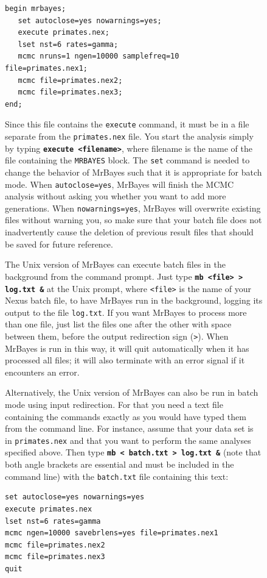 \documentclass[12pt]{book}
\newcommand{\ttt}[1]{\texttt{#1}}
\newcommand{\tb}[1]{\ttt{\textbf{#1}}}
\begin{document}
\begin{figure}[h]
\begin{singlespacing}
\footnotesize
\begin{verbatim}
begin mrbayes;
   set autoclose=yes nowarnings=yes;
   execute primates.nex;
   lset nst=6 rates=gamma;
   mcmc nruns=1 ngen=10000 samplefreq=10 file=primates.nex1;
   mcmc file=primates.nex2;
   mcmc file=primates.nex3;
end;
\end{verbatim}
\normalsize
\end{singlespacing}

Since this file contains the \ttt{execute} command, it must be in a file separate from the
\ttt{primates.nex} file. You start the analysis simply by typing \tb{execute <filename>}, where
filename is the name of the file containing the \ttt{MRBAYES} block. The \ttt{set} command is
needed to change the behavior of MrBayes such that it is appropriate for batch mode. When
\ttt{autoclose=yes}, MrBayes will finish the MCMC analysis without asking you whether you want to
add more generations. When \ttt{nowarnings=yes}, MrBayes will overwrite existing files without
warning you, so make sure that your batch file does not inadvertently cause the deletion of
previous result files that should be saved for future reference.

The Unix version of MrBayes can execute batch files in the background from the command prompt. Just
type \tb{mb <file> > log.txt \&} at the Unix prompt, where \ttt{<file>} is the name of your Nexus
batch file, to have MrBayes run in the background, logging its output to the file \ttt{log.txt}. If
you want MrBayes to process more than one file, just list the files one after the other with space
between them, before the output redirection sign (\ttt{>}). When MrBayes is run in this way, it
will quit automatically when it has processed all files; it will also terminate with an error
signal if it encounters an error.

Alternatively, the Unix version of MrBayes can also be run in batch mode using input redirection.
For that you need a text file containing the commands exactly as you would have typed them from the
command line. For instance, assume that your data set is in \ttt{primates.nex} and that you want to
perform the same analyses specified above. Then type \tb{mb < batch.txt > log.txt \&} (note that
both angle brackets are essential and must be included in the command line) with the
\ttt{batch.txt} file containing this text:

\begin{singlespacing}
\footnotesize
\begin{verbatim}
set autoclose=yes nowarnings=yes
execute primates.nex
lset nst=6 rates=gamma
mcmc ngen=10000 savebrlens=yes file=primates.nex1
mcmc file=primates.nex2
mcmc file=primates.nex3
quit
\end{verbatim}
\normalsize
\end{singlespacing}


\end{figure}
\end{document}
